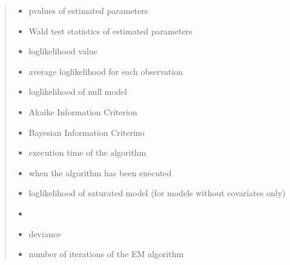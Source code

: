 \documentclass[letterpaper,10pt,english]{sphinxmanual}
\begin{document}
\begin{fulllineitems}
\begin{quote}
\begin{description}
\begin{itemize}
\item {} 
\sphinxAtStartPar
{} \textendash{} p\sphinxhyphen{}values of estimated parameters

\item {} 
\sphinxAtStartPar
{} \textendash{} Wald test statistics of estimated parameters

\item {} 
\sphinxAtStartPar
{} \textendash{} log\sphinxhyphen{}likelihood value

\item {} 
\sphinxAtStartPar
{} \textendash{} average log\sphinxhyphen{}likelihood for each observation

\item {} 
\sphinxAtStartPar
{} \textendash{} log\sphinxhyphen{}likelihood of null model

\item {} 
\sphinxAtStartPar
{} \textendash{} Akaike Information Criterion

\item {} 
\sphinxAtStartPar
{} \textendash{} Bayesian Information Criterino

\item {} 
\sphinxAtStartPar
{} \textendash{} execution time of the algorithm

\item {} 
\sphinxAtStartPar
{} \textendash{} when the algorithm has been executed

\item {} 
\sphinxAtStartPar
{} \textendash{} log\sphinxhyphen{}likelihood of saturated model (for models without covariates only)

\item {} 
\sphinxAtStartPar
{} \textendash{} 

\item {} 
\sphinxAtStartPar
{} \textendash{} deviance

\item {} 
\sphinxAtStartPar
{} \textendash{} number of iterations of the EM algorithm


\end{itemize}
\end{description}
\end{quote}
\end{fulllineitems}
\end{document}
